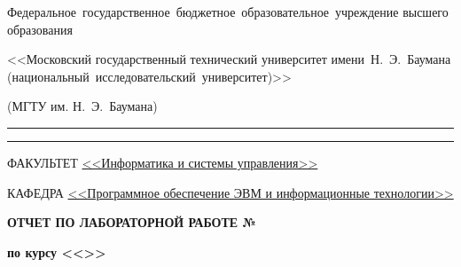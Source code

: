 \begin{titlepage}
\begin{center}
\begin{minipage}{0.85\textwidth}
{                    %
                    {Федеральное~государственное~бюджетное~образовательное~учреждение высшего образования}

                    {<<Московский государственный технический университет имени~Н.~Э.~Баумана (национальный~исследовательский~университет)>>}

                    {(МГТУ им. Н.~Э.~Баумана)}
                    \vspace{0.1cm}
                }
            \end{minipage}

        \vspace{0.2cm}
        \rule{\linewidth}{2.8pt}
        \rule[3ex]{\linewidth}{1pt}

        \begin{flushleft}
            {ФАКУЛЬТЕТ \uline{<<Информатика и системы управления>> \hfill}}

            \vspace{0.5cm}

            {КАФЕДРА \uline{<<Программное обеспечение ЭВМ и информационные технологии>> \hfill}}
        \end{flushleft}

        \vfill

        {
            \Large{\textbf{
                {ОТЧЕТ ПО ЛАБОРАТОРНОЙ РАБОТЕ №\labnumber}
            }}

            \Large{\textbf{
                {по курсу <<\coursename>>}
            }}

            \vspace{0.5cm}
        }

        \vspace{0.5cm}



\end{center}
\end{titlepage}
